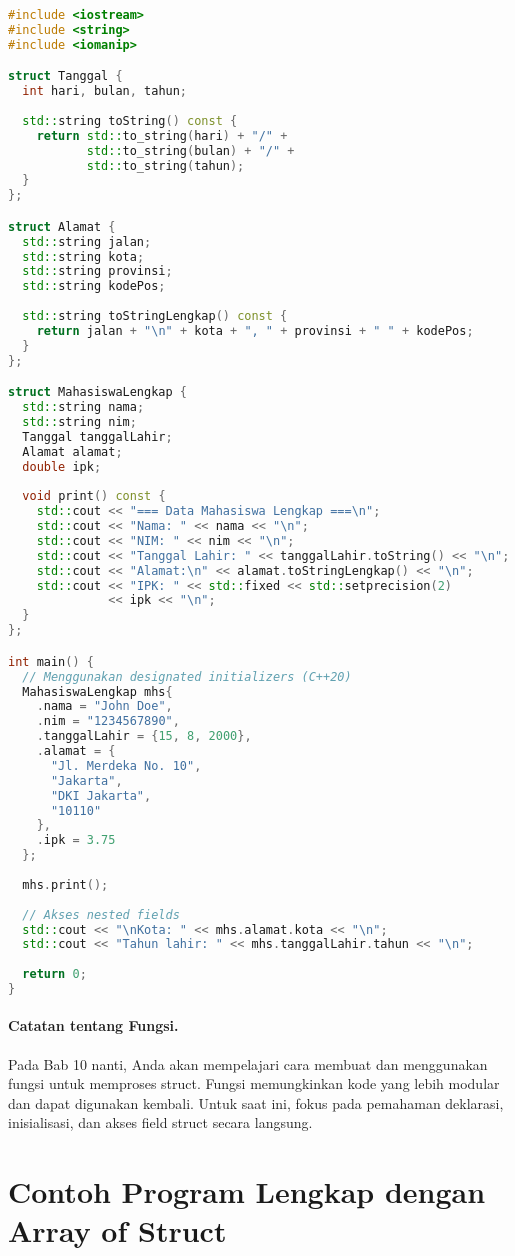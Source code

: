 \documentclass[../main.tex]{subfiles}
\begin{document}
\begin{lstlisting}[language=C++, caption={Nested struct di C++}]
#include <iostream>
#include <string>
#include <iomanip>

struct Tanggal {
  int hari, bulan, tahun;
  
  std::string toString() const {
    return std::to_string(hari) + "/" + 
           std::to_string(bulan) + "/" + 
           std::to_string(tahun);
  }
};

struct Alamat {
  std::string jalan;
  std::string kota;
  std::string provinsi;
  std::string kodePos;
  
  std::string toStringLengkap() const {
    return jalan + "\n" + kota + ", " + provinsi + " " + kodePos;
  }
};

struct MahasiswaLengkap {
  std::string nama;
  std::string nim;
  Tanggal tanggalLahir;
  Alamat alamat;
  double ipk;
  
  void print() const {
    std::cout << "=== Data Mahasiswa Lengkap ===\n";
    std::cout << "Nama: " << nama << "\n";
    std::cout << "NIM: " << nim << "\n";
    std::cout << "Tanggal Lahir: " << tanggalLahir.toString() << "\n";
    std::cout << "Alamat:\n" << alamat.toStringLengkap() << "\n";
    std::cout << "IPK: " << std::fixed << std::setprecision(2) 
              << ipk << "\n";
  }
};

int main() {
  // Menggunakan designated initializers (C++20)
  MahasiswaLengkap mhs{
    .nama = "John Doe",
    .nim = "1234567890",
    .tanggalLahir = {15, 8, 2000},
    .alamat = {
      "Jl. Merdeka No. 10",
      "Jakarta",
      "DKI Jakarta",
      "10110"
    },
    .ipk = 3.75
  };
  
  mhs.print();
  
  // Akses nested fields
  std::cout << "\nKota: " << mhs.alamat.kota << "\n";
  std::cout << "Tahun lahir: " << mhs.tanggalLahir.tahun << "\n";
  
  return 0;
}
\end{lstlisting}

\paragraph{Catatan tentang Fungsi.} Pada Bab 10 nanti, Anda akan mempelajari cara membuat dan menggunakan fungsi untuk memproses struct. Fungsi memungkinkan kode yang lebih modular dan dapat digunakan kembali. Untuk saat ini, fokus pada pemahaman deklarasi, inisialisasi, dan akses field struct secara langsung.

\section{Contoh Program Lengkap dengan Array of Struct}
\end{document}
